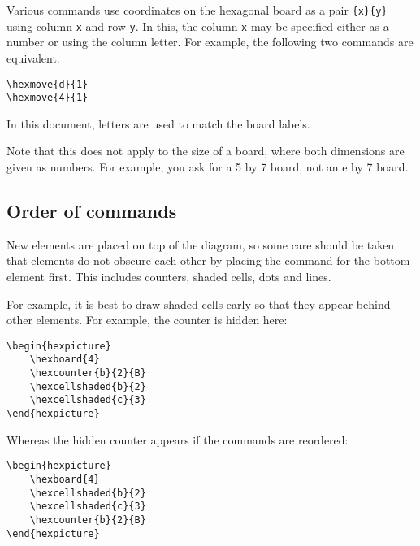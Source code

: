 \documentclass[a4paper,12pt]{article}
\begin{document}
    Various commands use coordinates on the hexagonal board as a pair \verb|{x}{y}| using column \verb|x| and row \verb|y|. In this, the column \verb|x| may be specified either as a number or using the column letter. For example, the following two commands are equivalent. 
    
    \begin{verbatim}\hexmove{d}{1}
\hexmove{4}{1}\end{verbatim}
    
    In this document, letters are used to match the board labels.
    
    Note that this does not apply to the size of a board, where both dimensions are given as numbers. For example, you ask for a 5 by 7 board, not an e by 7 board.
    
    \subsection{Order of commands}

    New elements are placed on top of the diagram, so some care should be taken that elements do not obscure each other by placing the command for the bottom element first. This includes counters, shaded cells, dots and lines.
    
    For example, it is best to draw shaded cells early so that they appear behind other elements. For example, the counter is hidden here:

    \begin{verbatim}\begin{hexpicture}
    \hexboard{4}
    \hexcounter{b}{2}{B}
    \hexcellshaded{b}{2}
    \hexcellshaded{c}{3}
\end{hexpicture}\end{verbatim}

    \begin{hexpicture}
    \end{hexpicture}
    
    Whereas the hidden counter appears if the commands are reordered:

\begin{verbatim}\begin{hexpicture}
    \hexboard{4}
    \hexcellshaded{b}{2}
    \hexcellshaded{c}{3}
    \hexcounter{b}{2}{B}
\end{hexpicture}\end{verbatim}
\end{document}
